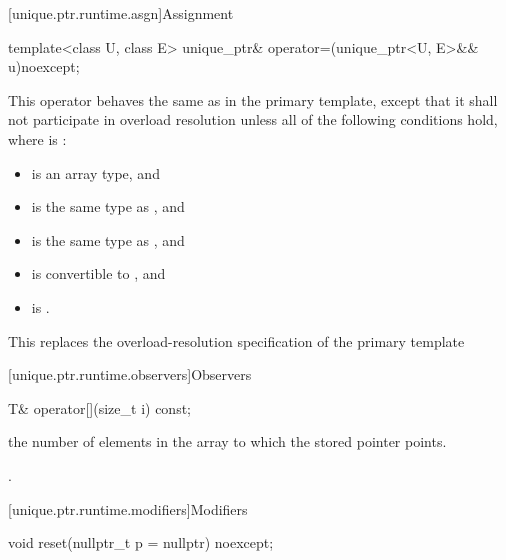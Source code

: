[unique.ptr.runtime.asgn]{Assignment}

%
\begin{itemdecl}
template<class U, class E> unique_ptr& operator=(unique_ptr<U, E>&& u)noexcept;
\end{itemdecl}

\begin{itemdescr}
\pnum
This operator behaves the same as in the primary template,
except that it shall not participate in overload resolution
unless all of the following conditions hold,
where  is :

\begin{itemize}
\item {} is an array type, and
\item {} is the same type as , and
\item {} is the same type as , and
\item {} is convertible to , and
\item {} is .
\end{itemize}

\begin{note}
This replaces the overload-resolution specification of the primary template
\end{note}
\end{itemdescr}

[unique.ptr.runtime.observers]{Observers}

%
\begin{itemdecl}
T& operator[](size_t i) const;
\end{itemdecl}

\begin{itemdescr}
\pnum
\requires {} the
number of elements in the array to which
the stored pointer points.

\pnum
\returns {}.
\end{itemdescr}

[unique.ptr.runtime.modifiers]{Modifiers}

%
\begin{itemdecl}
void reset(nullptr_t p = nullptr) noexcept;
\end{itemdecl}

